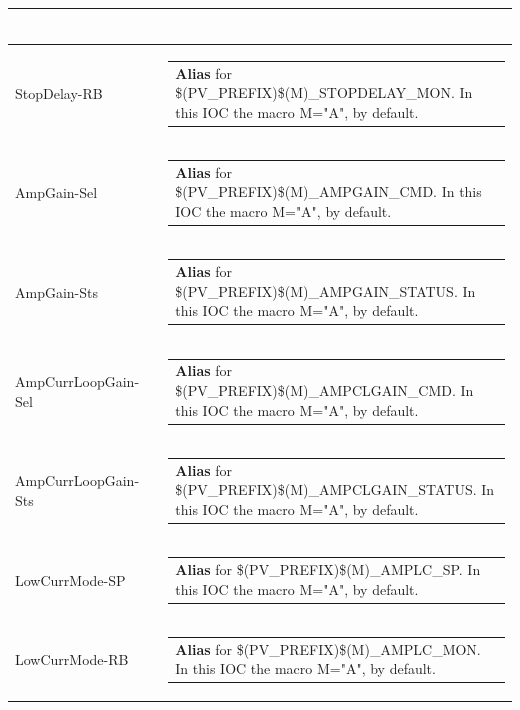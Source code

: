 \documentclass[openany]{article}
\begin{document}
\begin{longtable}{| m{4.5cm} m{2.5cm}  m{8.0cm} |}
\begin{tabular}{@{}m{6cm}@{}}
            \end{tabular} \hypertarget{}{}\\ \hline
        StopDelay-RB &  & \begin{tabular}{@{}m{6cm}@{}}
                \textbf{Alias} for \$(PV\_PREFIX)\$(M)\_STOPDELAY\_MON. In this IOC the macro M="A", by default.
            \end{tabular} \hypertarget{}{}\\ \hline
        AmpGain-Sel &  & \begin{tabular}{@{}m{6cm}@{}}
                \textbf{Alias} for \$(PV\_PREFIX)\$(M)\_AMPGAIN\_CMD. In this IOC the macro M="A", by default.
            \end{tabular} \hypertarget{}{}\\ \hline
        AmpGain-Sts &  & \begin{tabular}{@{}m{6cm}@{}}
                \textbf{Alias} for \$(PV\_PREFIX)\$(M)\_AMPGAIN\_STATUS. In this IOC the macro M="A", by default.
            \end{tabular} \hypertarget{}{}\\ \hline
        AmpCurrLoopGain-Sel &  & \begin{tabular}{@{}m{6cm}@{}}
                \textbf{Alias} for \$(PV\_PREFIX)\$(M)\_AMPCLGAIN\_CMD. In this IOC the macro M="A", by default.
            \end{tabular} \hypertarget{}{}\\ \hline
        AmpCurrLoopGain-Sts &  & \begin{tabular}{@{}m{6cm}@{}}
                \textbf{Alias} for \$(PV\_PREFIX)\$(M)\_AMPCLGAIN\_STATUS. In this IOC the macro M="A", by default.
            \end{tabular} \hypertarget{}{}\\ \hline
        LowCurrMode-SP &  & \begin{tabular}{@{}m{6cm}@{}}
                \textbf{Alias} for \$(PV\_PREFIX)\$(M)\_AMPLC\_SP. In this IOC the macro M="A", by default.
            \end{tabular} \hypertarget{}{}\\ \hline
        LowCurrMode-RB &  & \begin{tabular}{@{}m{6cm}@{}}
                \textbf{Alias} for \$(PV\_PREFIX)\$(M)\_AMPLC\_MON. In this IOC the macro M="A", by default.
            \end{tabular} \hypertarget{}{}\\ \hline

\end{longtable}
\end{document}
